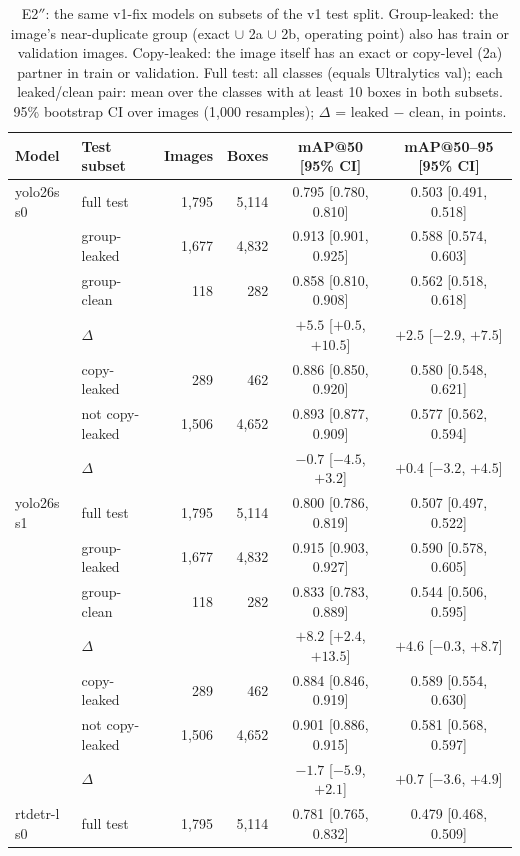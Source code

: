 \begin{table}[tp]
\centering\footnotesize
\caption{E2$''$: the same v1-fix models on subsets of the v1 test split. Group-leaked: the image's near-duplicate group (exact $\cup$ 2a $\cup$ 2b, operating point) also has train or validation images. Copy-leaked: the image itself has an exact or copy-level (2a) partner in train or validation. Full test: all classes (equals Ultralytics val); each leaked/clean pair: mean over the classes with at least 10 boxes in both subsets. 95\% bootstrap CI over images (1{,}000 resamples); $\Delta$ = leaked $-$ clean, in points.}
\label{tab:e2pp}
\setlength{\tabcolsep}{3pt}
\begin{tabular}{llrrcc}
\toprule
Model & Test subset & Images & Boxes & mAP@50 [95\% CI] & mAP@50--95 [95\% CI] \\
\midrule
yolo26s s0 & full test & 1{,}795 & 5{,}114 & 0.795 [0.780, 0.810] & 0.503 [0.491, 0.518] \\
 & group-leaked & 1{,}677 & 4{,}832 & 0.913 [0.901, 0.925] & 0.588 [0.574, 0.603] \\
 & group-clean & 118 & 282 & 0.858 [0.810, 0.908] & 0.562 [0.518, 0.618] \\
 & $\Delta$ & & & $+5.5$ [$+0.5$, $+10.5$] & $+2.5$ [$-2.9$, $+7.5$] \\
 & copy-leaked & 289 & 462 & 0.886 [0.850, 0.920] & 0.580 [0.548, 0.621] \\
 & not copy-leaked & 1{,}506 & 4{,}652 & 0.893 [0.877, 0.909] & 0.577 [0.562, 0.594] \\
 & $\Delta$ & & & $-0.7$ [$-4.5$, $+3.2$] & $+0.4$ [$-3.2$, $+4.5$] \\
\midrule
yolo26s s1 & full test & 1{,}795 & 5{,}114 & 0.800 [0.786, 0.819] & 0.507 [0.497, 0.522] \\
 & group-leaked & 1{,}677 & 4{,}832 & 0.915 [0.903, 0.927] & 0.590 [0.578, 0.605] \\
 & group-clean & 118 & 282 & 0.833 [0.783, 0.889] & 0.544 [0.506, 0.595] \\
 & $\Delta$ & & & $+8.2$ [$+2.4$, $+13.5$] & $+4.6$ [$-0.3$, $+8.7$] \\
 & copy-leaked & 289 & 462 & 0.884 [0.846, 0.919] & 0.589 [0.554, 0.630] \\
 & not copy-leaked & 1{,}506 & 4{,}652 & 0.901 [0.886, 0.915] & 0.581 [0.568, 0.597] \\
 & $\Delta$ & & & $-1.7$ [$-5.9$, $+2.1$] & $+0.7$ [$-3.6$, $+4.9$] \\
\midrule
rtdetr-l s0 & full test & 1{,}795 & 5{,}114 & 0.781 [0.765, 0.832] & 0.479 [0.468, 0.509] \\

\end{tabular}
\end{table}
